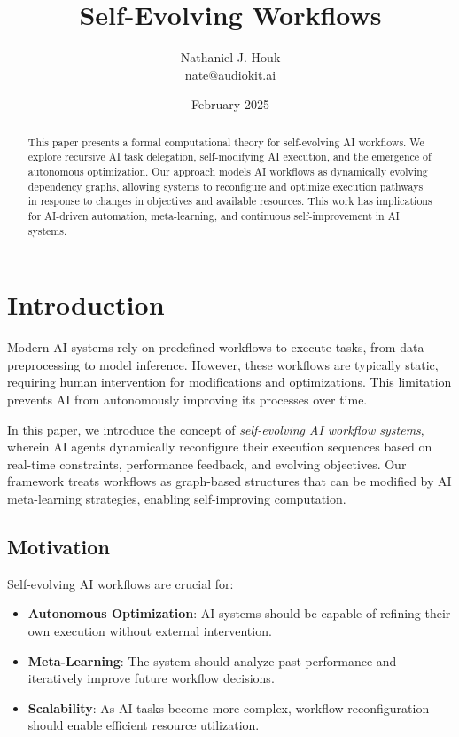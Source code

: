 \documentclass{article}
\title{Self-Evolving Workflows}
\author{Nathaniel J. Houk \\ nate@audiokit.ai}
\date{February 2025}
\begin{document}
\maketitle
\tableofcontents

\begin{abstract}
This paper presents a formal computational theory for self-evolving AI workflows. We explore recursive AI task delegation, self-modifying AI execution, and the emergence of autonomous optimization. Our approach models AI workflows as dynamically evolving dependency graphs, allowing systems to reconfigure and optimize execution pathways in response to changes in objectives and available resources. This work has implications for AI-driven automation, meta-learning, and continuous self-improvement in AI systems.
\end{abstract}

\section{Introduction}

Modern AI systems rely on predefined workflows to execute tasks, from data preprocessing to model inference. However, these workflows are typically static, requiring human intervention for modifications and optimizations. This limitation prevents AI from autonomously improving its processes over time.

In this paper, we introduce the concept of \emph{self-evolving AI workflow systems}, wherein AI agents dynamically reconfigure their execution sequences based on real-time constraints, performance feedback, and evolving objectives. Our framework treats workflows as graph-based structures that can be modified by AI meta-learning strategies, enabling self-improving computation.

\subsection{Motivation}

Self-evolving AI workflows are crucial for:
\begin{itemize}
    \item \textbf{Autonomous Optimization}: AI systems should be capable of refining their own execution without external intervention.
    \item \textbf{Meta-Learning}: The system should analyze past performance and iteratively improve future workflow decisions.
    \item \textbf{Scalability}: As AI tasks become more complex, workflow reconfiguration should enable efficient resource utilization.
\end{itemize}
\end{document}
